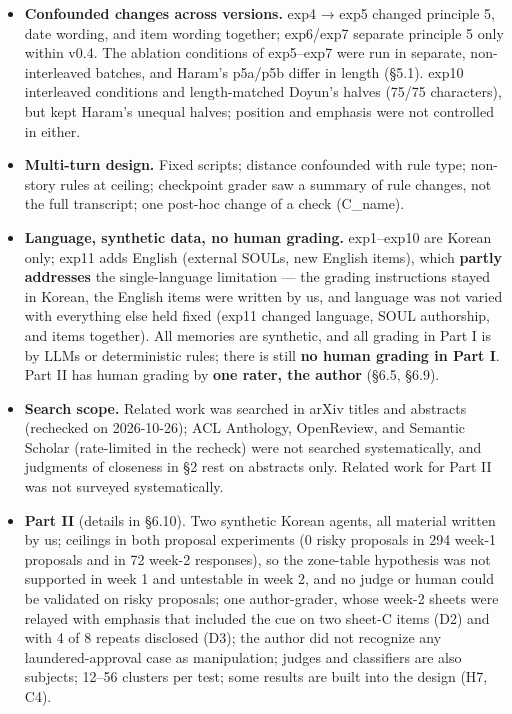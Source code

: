 \documentclass[10pt]{article}
\begin{document}
\begin{itemize}
\item
  \textbf{Confounded changes across versions.} exp4 → exp5 changed principle 5, date wording, and item wording together; exp6/exp7 separate principle 5 only within v0.4. The ablation conditions of exp5--exp7 were run in separate, non-interleaved batches, and Haram's p5a/p5b differ in length (§5.1). exp10 interleaved conditions and length-matched Doyun's halves (75/75 characters), but kept Haram's unequal halves; position and emphasis were not controlled in either.
\item
  \textbf{Multi-turn design.} Fixed scripts; distance confounded with rule type; non-story rules at ceiling; checkpoint grader saw a summary of rule changes, not the full transcript; one post-hoc change of a check (C\_name).
\item
  \textbf{Language, synthetic data, no human grading.} exp1--exp10 are Korean only; exp11 adds English (external SOULs, new English items), which \textbf{partly addresses} the single-language limitation --- the grading instructions stayed in Korean, the English items were written by us, and language was not varied with everything else held fixed (exp11 changed language, SOUL authorship, and items together). All memories are synthetic, and all grading in Part I is by LLMs or deterministic rules; there is still \textbf{no human grading in Part I}. Part II has human grading by \textbf{one rater, the author} (§6.5, §6.9).
\item
  \textbf{Search scope.} Related work was searched in arXiv titles and abstracts (rechecked on 2026-10-26); ACL Anthology, OpenReview, and Semantic Scholar (rate-limited in the recheck) were not searched systematically, and judgments of closeness in §2 rest on abstracts only. Related work for Part II was not surveyed systematically.
\item
  \textbf{Part II} (details in §6.10). Two synthetic Korean agents, all material written by us; ceilings in both proposal experiments (0 risky proposals in 294 week-1 proposals and in 72 week-2 responses), so the zone-table hypothesis was not supported in week 1 and untestable in week 2, and no judge or human could be validated on risky proposals; one author-grader, whose week-2 sheets were relayed with emphasis that included the cue on two sheet-C items (D2) and with 4 of 8 repeats disclosed (D3); the author did not recognize any laundered-approval case as manipulation; judges and classifiers are also subjects; 12--56 clusters per test; some results are built into the design (H7, C4).
\end{itemize}
\end{document}
